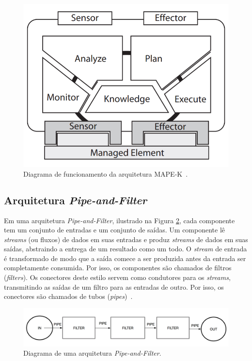 \documentclass[portugues]{ic-tese}
\begin{document}
\begin{figure}[H]
\centering
\includegraphics[scale=0.5]{images/MAPE-K.png}
\caption {Diagrama de funcionamento da arquitetura MAPE-K~\citep{Abbas_2010}.}
\label{fig:MAPEK}
\end{figure}

\subsection{Arquitetura \textit{Pipe-and-Filter}}

Em uma arquitetura \textit{Pipe-and-Filter}, ilustrado na Figura \ref{fig:PipeandFilter}, cada componente tem um conjunto de entradas e um conjunto de saídas. Um componente lê \textit{streams} (ou fluxos) de dados em suas entradas e produz \textit{streams} de dados em suas saídas, abstraindo a entrega de um resultado como um todo. O \textit{stream} de entrada é transformado de modo que a saída comece a ser produzida antes da entrada ser completamente consumida. Por isso, os componentes são chamados de filtros (\textit{filters}). Os conectores deste estilo servem como condutores para os \textit{streams}, transmitindo as saídas de um filtro para as entradas de outro. Por isso, os conectores são chamados de tubos (\textit{pipes})~\citep{Garlan_1993}.

\begin{figure}[h]
\centering
\includegraphics[scale=0.25]{images/PipeandFilter.png}
\caption {Diagrama de uma arquitetura \textit{Pipe-and-Filter}.}
\label{fig:PipeandFilter}
\end{figure}
\end{document}
